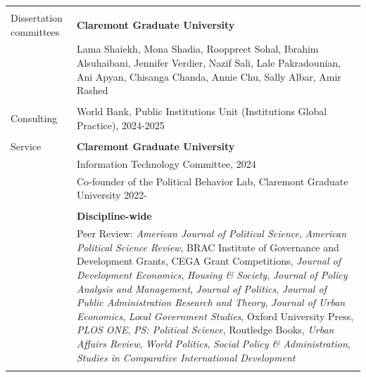\documentclass[letterpaper, 10.5pt]{article}
\begin{document}
\begin{longtable}{p{1.5in}p{5in}}
&\\

%
%
%


{{Dissertation committees}}
& \textbf{Claremont Graduate University} \\

&Lama Shaiekh, Mona Shadia, Rooppreet Sohal, Ibrahim Alsuhaibani, Jennifer Verdier, Nazif Sali, Lale Pakradounian, Ani Apyan, Chisanga Chanda, Annie Chu, Sally Albar, Amir Rashed \\
&\\

\nohyphens{{Consulting}} & World Bank, Public Institutions Unit (Institutions Global Practice), 2024-2025\\

&\\


\nohyphens{{Service}} & \textbf{Claremont Graduate University} \\ & Information Technology Committee, 2024 \\
& Co-founder of the Political Behavior Lab, Claremont Graduate University 2022- \\

&\\


& \textbf{Discipline-wide} \\
&Peer Review: \textit{American Journal of Political Science}, \textit{American Political Science Review}, BRAC Institute of Governance and Development Grants, CEGA Grant Competitions, \textit{Journal of Development Economics}, \textit{Housing \& Society},
\textit{Journal of Policy Analysis and Management}, \textit{Journal of Politics}, \textit{Journal of Public Administration Research and Theory}, \textit{Journal of Urban Economics}, \textit{Local Government Studies}, Oxford University Press, \textit{PLOS ONE}, \textit{PS: Political Science}, Routledge Books, \textit{Urban Affairs Review}, \textit{World Politics}, \textit{Social Policy \& Administration}, \textit{Studies in Comparative International Development}\\ 
&\\


\end{longtable}
\end{document}
